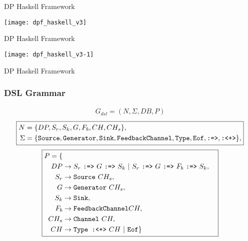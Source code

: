 \begin{frame}[fragile]{DP Haskell Framework}
  \begin{center}
    \texttt{[image: dpf\_haskell\_v3]}
  \end{center}
\end{frame}

  \begin{frame}[fragile]{DP Haskell Framework}
    \begin{center}
    \texttt{[image: dpf\_haskell\_v3-1]}
  \end{center}
\end{frame}


\begin{frame}[fragile]{DP Haskell Framework}
  \frametitle{DSL Grammar}
  \small
  \begin{equation*}
    \boxed{
     \begin{aligned}
    G_{dsl} = (N, \Sigma, DB, P)
    \end{aligned}
    }
\end{equation*}
\tiny
    \begin{equation*}
        \boxed{
         \begin{aligned}
        N &= \{DP,S_r,S_k,G,F_b,CH,CH_s\},\\
        \Sigma &= \{\text{\texttt{Source}},\text{\texttt{Generator}},\text{\texttt{Sink}},\text{\texttt{FeedbackChannel}},\text{\texttt{Type}},\text{\texttt{Eof}},\text{\texttt{:=>}},\text{\texttt{:<+>}}\},
        \end{aligned}
        }
    \end{equation*}
  \small
  \begin{equation*}
    \boxed{
      \begin{aligned}
    P = \{\\
    DP  &\rightarrow S_r\ \text{\texttt{:=>}}\ G\ \text{\texttt{:=>}}\ S_k\ |\ S_r\ \text{\texttt{:=>}}\ G\ \text{\texttt{:=>}}\ F_b\ \text{\texttt{:=>}}\ S_k,\\
    S_r &\rightarrow \text{\texttt{Source}}\ CH_s,\\
    G   &\rightarrow \text{\texttt{Generator}}\ CH_s,\\
    S_k &\rightarrow \text{\texttt{Sink}},\\
    F_b &\rightarrow \text{\texttt{FeedbackChannel}} CH,\\
    CH_s &\rightarrow \text{\texttt{Channel}}\ CH,\\
    CH &\rightarrow \text{\texttt{Type :<+>}}\ CH\ |\ \text{\texttt{Eof}}\}
  \end{aligned}
  }
  \end{equation*}
\end{frame}

